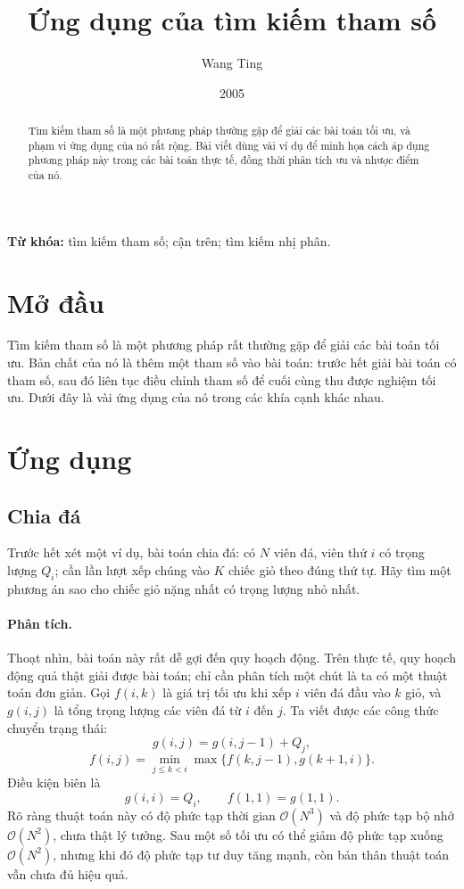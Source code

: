 \documentclass[11pt]{article}
\title{Ứng dụng của tìm kiếm tham số}
\author{Wang Ting}
\date{2005}
\newcommand{\Oh}{\mathcal{O}}
\begin{document}
\maketitle


\renewcommand{\abstractname}{Tóm tắt}
\begin{abstract}
Tìm kiếm tham số là một phương pháp thường gặp để giải các bài toán tối ưu,
và phạm vi ứng dụng của nó rất rộng. Bài viết dùng vài ví dụ để minh họa cách
áp dụng phương pháp này trong các bài toán thực tế, đồng thời phân tích ưu và
nhược điểm của nó.
\end{abstract}

\noindent\textbf{Từ khóa:} tìm kiếm tham số; cận trên; tìm kiếm nhị phân.

\section{Mở đầu}

Tìm kiếm tham số là một phương pháp rất thường gặp để giải các bài toán tối
ưu. Bản chất của nó là thêm một tham số vào bài toán: trước hết giải bài toán
có tham số, sau đó liên tục điều chỉnh tham số để cuối cùng thu được nghiệm
tối ưu. Dưới đây là vài ứng dụng của nó trong các khía cạnh khác nhau.

\section{Ứng dụng}

\subsection{Chia đá}

Trước hết xét một ví dụ, bài toán chia đá: có $N$ viên đá, viên thứ $i$ có
trọng lượng $Q_i$; cần lần lượt xếp chúng vào $K$ chiếc giỏ theo đúng thứ tự.
Hãy tìm một phương án sao cho chiếc giỏ nặng nhất có trọng lượng nhỏ nhất.

\paragraph{Phân tích.}
Thoạt nhìn, bài toán này rất dễ gợi đến quy hoạch động. Trên thực tế, quy
hoạch động quả thật giải được bài toán; chỉ cần phân tích một chút là ta có
một thuật toán đơn giản. Gọi $f(i,k)$ là giá trị tối ưu khi xếp $i$ viên đá
đầu vào $k$ giỏ, và $g(i,j)$ là tổng trọng lượng các viên đá từ $i$ đến $j$.
Ta viết được các công thức chuyển trạng thái:
\[
  g(i,j)=g(i,j-1)+Q_j,
\]
\[
  f(i,j)=\min_{j\le k<i}\max\{f(k,j-1),g(k+1,i)\}.
\]
Điều kiện biên là
\[
  g(i,i)=Q_i,\qquad f(1,1)=g(1,1).
\]
Rõ ràng thuật toán này có độ phức tạp thời gian $\Oh(N^3)$ và độ phức tạp bộ
nhớ $\Oh(N^2)$, chưa thật lý tưởng. Sau một số tối ưu có thể giảm độ phức tạp
xuống $\Oh(N^2)$, nhưng khi đó độ phức tạp tư duy tăng mạnh, còn bản thân
thuật toán vẫn chưa đủ hiệu quả.
\end{document}
